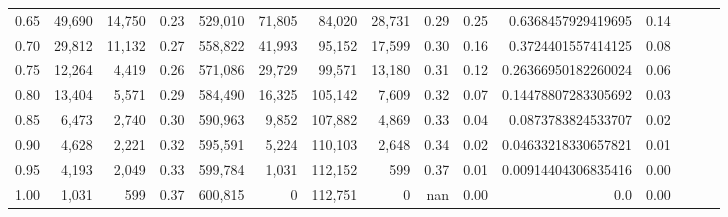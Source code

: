 \begin{tabular}{rrrrrrrrrrrrrrr}
0.65 &  49,690 &  14,750 &  0.23 &  529,010 &   71,805 &   84,020 &   28,731 &  0.29 &  0.25 &   0.6368457929419695 &      0.14 \\
0.70 &  29,812 &  11,132 &  0.27 &  558,822 &   41,993 &   95,152 &   17,599 &  0.30 &  0.16 &   0.3724401557414125 &      0.08 \\
0.75 &  12,264 &   4,419 &  0.26 &  571,086 &   29,729 &   99,571 &   13,180 &  0.31 &  0.12 &  0.26366950182260024 &      0.06 \\
0.80 &  13,404 &   5,571 &  0.29 &  584,490 &   16,325 &  105,142 &    7,609 &  0.32 &  0.07 &  0.14478807283305692 &      0.03 \\
0.85 &   6,473 &   2,740 &  0.30 &  590,963 &    9,852 &  107,882 &    4,869 &  0.33 &  0.04 &   0.0873783824533707 &      0.02 \\
0.90 &   4,628 &   2,221 &  0.32 &  595,591 &    5,224 &  110,103 &    2,648 &  0.34 &  0.02 &  0.04633218330657821 &      0.01 \\
0.95 &   4,193 &   2,049 &  0.33 &  599,784 &    1,031 &  112,152 &      599 &  0.37 &  0.01 &  0.00914404306835416 &      0.00 \\
1.00 &   1,031 &     599 &  0.37 &  600,815 &        0 &  112,751 &        0 &   nan &  0.00 &                  0.0 &      0.00 \\
\bottomrule
\end{tabular}
